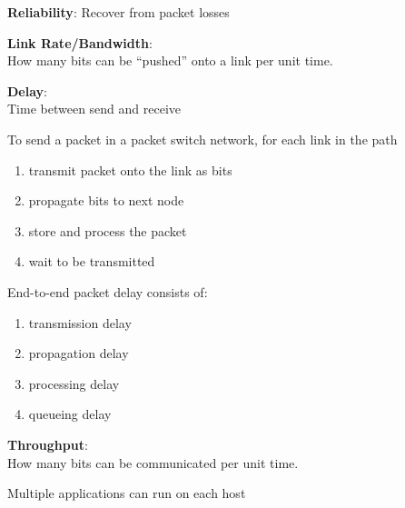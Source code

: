\begin{frame}\begin{center}\large
\textbf{Reliability}: Recover from packet losses
\end{center}\end{frame}

\begin{frame}\begin{center}\large
\textbf{Link Rate/Bandwidth}:\\ How many bits can be ``pushed'' onto a link per unit time.
\end{center}\end{frame}

\begin{frame}\begin{center}\large
\textbf{Delay}:\\ Time between send and receive
\end{center}\end{frame}

\begin{frame}\normalsize
To send a packet in a packet switch network, for each link in the path
\begin{enumerate}
\item transmit packet onto the link as bits
\item propagate bits to next node
\item store and process the packet
\item wait to be transmitted
\end{enumerate}
\end{frame}

\begin{frame}\normalsize
End-to-end packet delay consists of:
\begin{enumerate}
\item transmission delay
\item propagation delay
\item processing delay
\item queueing delay
\end{enumerate}
\end{frame}



\begin{cf}{
\textbf{Throughput}:\\ How many bits can be communicated per unit time.
}
\end{cf}

\begin{frame}[t]\normalsize
	Multiple applications can run on each host
\end{frame}

